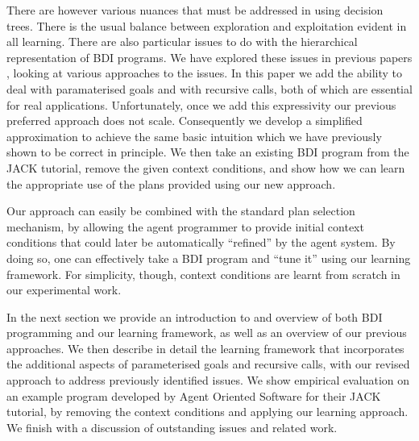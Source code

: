 There are however various nuances that must be addressed in using
decision trees. There is the usual balance between exploration and
exploitation evident in all learning. There are also particular issues
to do with the hierarchical representation of BDI programs. 
%
We have explored these issues in previous papers
\cite{Airiau:IJAT09,Singh:AAMAS10}, looking at various approaches to the
issues. In this paper we add the ability to deal with paramaterised
goals and with recursive calls, both of which are essential for real
applications. Unfortunately, once we add this expressivity our
previous preferred approach does not scale. Consequently we develop a
simplified approximation to achieve the same basic intuition which we
have previously shown to be correct in principle. We then take an existing BDI
program from the JACK tutorial, remove the given context conditions,
and show how we can learn the appropriate use of the plans provided
using our new approach.

Our approach can easily be combined with the standard plan selection
mechanism, by allowing the agent programmer to provide initial context conditions
that could later be automatically ``refined'' by the agent system. By doing so,
one can effectively take a BDI program and ``tune it'' using our learning
framework.
For simplicity, though, context conditions are learnt from scratch in our
experimental work.

In the next section we provide an introduction to and overview of both
BDI programming and our learning framework, as well as an overview of
our previous approaches. We then describe in detail
the learning framework that incorporates the additional aspects of
parameterised goals and recursive calls, with our revised approach to
address previously identified issues.
We show empirical evaluation on an example program developed by
Agent Oriented Software for their JACK tutorial, by removing the context
conditions and applying our learning approach.  We finish with a
discussion of outstanding issues and related work.

%
